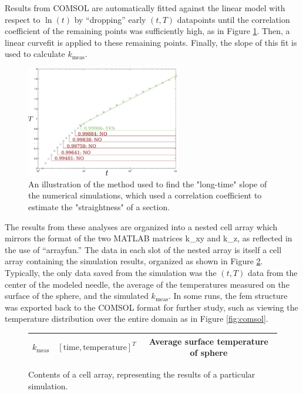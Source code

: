 Results from COMSOL are automatically fitted against the linear model with
respect to \(\ln(t)\) by ``dropping'' early \((t,T)\) datapoints until the
correlation coefficient of the remaining points was sufficiently high, as in Figure \ref{fig:curvefit}. Then, a
linear curvefit is applied to these remaining points. Finally, the slope of this fit is
used to calculate \(k_{\textrm{meas}}\).

\begin{figure}[h]
\centering
\includegraphics[width=0.6\textwidth]{fig/curvefit.png}
\caption{An illustration of the method used to find the "long-time" slope of the numerical simulations, which used a correlation coefficient to estimate the "straightness" of a section.}
\label{fig:curvefit}
\end{figure}

The results from these analyses are organized into a nested
cell array which mirrors the format of the two MATLAB matrices k\_xy and k\_z,
as reflected in the use of ``arrayfun.'' The data in each slot of the
nested array is itself a cell array containing the simulation results, organized as shown
in Figure \ref{fig:cellarray}. Typically, the only data saved from the simulation was the \((t,T)\) data from the center of the modeled needle, the average of the temperatures measured on the surface of the sphere, and the simulated \(k_{\textrm{meas}}\). In some runs, the fem structure was exported back to the COMSOL format for
further study, such as viewing the temperature distribution over the entire
domain as in Figure \ref{fig:comsol}. 


\begin{figure}

\centering
\begin{tabular}{| c | c | c |}
\hline
\(k_\textrm{meas}\) & \( \left[ \textrm{time}, \textrm{temperature} \right]^T\) & Average surface temperature of sphere\\
\hline
\end{tabular}
\caption{Contents of a cell array, representing the results of a particular simulation.}
\label{fig:cellarray}
\end{figure}

